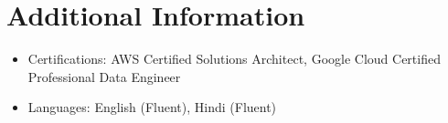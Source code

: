\documentclass[a4paper,10pt]{article}
\begin{document}
\vspace{0.5em} %

\section*{Additional Information}
\begin{itemize}[leftmargin=0.3in, itemsep=4pt, topsep=4pt]
    \item Certifications: AWS Certified Solutions Architect, Google Cloud Certified Professional Data Engineer
    \item Languages: English (Fluent), Hindi (Fluent)
\end{itemize}
\end{document}
